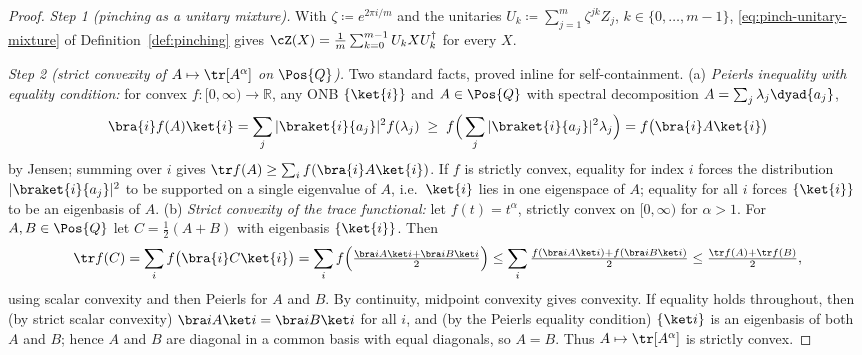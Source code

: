\begin{proof}
\emph{Step 1 (pinching as a unitary mixture).} With
$\zeta\coloneqq e^{2\pi i/m}$ and the unitaries
$U_k\coloneqq\sum_{j=1}^{m}\zeta^{jk}Z_j$, $k\in\{0,\dots,m-1\}$,
\eqref{eq:pinch-unitary-mixture} of Definition~\ref{def:pinching} gives
$\cZ(X)=\frac1m\sum_{k=0}^{m-1}U_kXU_k^{\dagger}$ for every $X$.

\emph{Step 2 (strict convexity of $A\mapsto\tr[A^{\alpha}]$ on
$\Pos{Q}$).} Two standard facts, proved inline for self-containment. (a)
\emph{Peierls inequality with equality condition:} for convex
$f:[0,\infty)\to\mathbb{R}$, any ONB $\{\ket{i}\}$ and $A\in\Pos{Q}$ with
spectral decomposition $A=\sum_j\lambda_j\dyad{a_j}$,
\begin{equation*}
  \bra{i}f(A)\ket{i}
  =\sum_j|\braket{i}{a_j}|^2f(\lambda_j)
  \;\ge\;f\Big(\sum_j|\braket{i}{a_j}|^2\lambda_j\Big)
  =f\big(\bra{i}A\ket{i}\big)
\end{equation*}
by Jensen; summing over $i$ gives
$\tr f(A)\ge\sum_if(\bra{i}A\ket{i})$. If $f$ is strictly convex, equality
for index $i$ forces the distribution $|\braket{i}{a_j}|^2$ to be supported
on a single eigenvalue of $A$, i.e.\ $\ket{i}$ lies in one eigenspace of
$A$; equality for all $i$ forces $\{\ket{i}\}$ to be an eigenbasis of $A$.
(b) \emph{Strict convexity of the trace functional:} let
$f(t)=t^{\alpha}$, strictly convex on $[0,\infty)$ for $\alpha>1$. For
$A,B\in\Pos{Q}$ let $C=\tfrac12(A+B)$ with eigenbasis $\{\ket{i}\}$. Then
\begin{equation*}
  \tr f(C)=\sum_if\big(\bra{i}C\ket{i}\big)
  =\sum_if\Big(\tfrac{\bra iA\ket i+\bra iB\ket i}{2}\Big)
  \le\sum_i\tfrac{f(\bra iA\ket i)+f(\bra iB\ket i)}{2}
  \le\tfrac{\tr f(A)+\tr f(B)}{2},
\end{equation*}
using scalar convexity and then Peierls for $A$ and $B$. By continuity,
midpoint convexity gives convexity. If equality holds throughout, then (by
strict scalar convexity) $\bra iA\ket i=\bra iB\ket i$ for all $i$, and (by
the Peierls equality condition) $\{\ket i\}$ is an eigenbasis of both $A$
and $B$; hence $A$ and $B$ are diagonal in a common basis with equal
diagonals, so $A=B$. Thus $A\mapsto\tr[A^{\alpha}]$ is strictly convex.


\end{proof}
